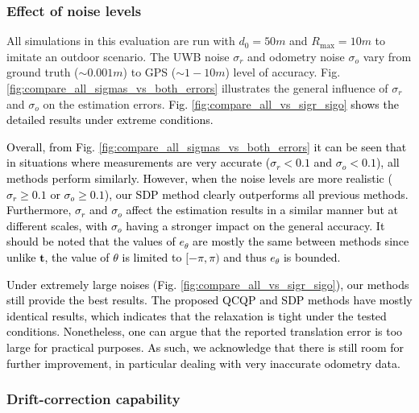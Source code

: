 \documentclass[journal]{IEEEtran}
\begin{document}
\subsubsection{Effect of noise levels}

All simulations in this evaluation are run with $d_0 = 50\si{m}$ and $R_{\max} = 10\si{m}$ to imitate an outdoor scenario. The UWB noise $\sigma_r$ and odometry noise $\sigma_o$ vary from ground truth  ($\sim 0.001\si{m}$) to GPS ($\sim 1-10\si{m}$) level of accuracy.
Fig. \ref{fig:compare_all_sigmas_vs_both_errors} illustrates the general influence of $\sigma_r$ and $\sigma_o$ on the estimation errors. \textcolor{black}{
Fig. \ref{fig:compare_all_vs_sigr_sigo} shows the detailed results under extreme conditions.} %

\textcolor{black}{Overall, from Fig. \ref{fig:compare_all_sigmas_vs_both_errors} it can be seen that in situations where measurements are very accurate ($\sigma_r < 0.1$ and $\sigma_o < 0.1$), all methods perform similarly. However, when the noise levels are more realistic ($\sigma_r \geq 0.1$ or $\sigma_o \geq 0.1$), our SDP method clearly outperforms all previous methods. Furthermore, $\sigma_r$ and $\sigma_o$ affect the estimation results in a similar manner but at different scales, with $\sigma_o$ having a stronger impact on the general accuracy. It should be noted that the values of $e_{\theta}$ are mostly the same between methods since unlike $\mathbf{t}$, the value of $\theta$ is limited to $[-\pi, \pi)$ and thus $e_{\theta}$ is bounded.}

\textcolor{black}{
Under extremely large noises (Fig. \ref{fig:compare_all_vs_sigr_sigo}), our methods still provide the best results. The proposed QCQP and SDP methods have mostly identical results, which indicates that the relaxation is tight under the tested conditions. 
Nonetheless, one can argue that the reported translation error is too large for practical purposes. As such, we acknowledge that there is still room for further improvement, in particular dealing with very inaccurate odometry data.}

\subsubsection{Drift-correction capability}
\end{document}
